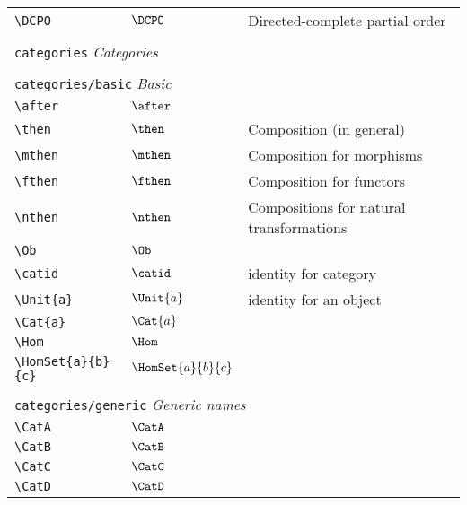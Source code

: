 \begin{longtable}{lll}
 {\color[rgb]{0.5,0.5,0.5}\texttt{\textbackslash DCPO}} & $\DCPO$ &  Directed-complete partial order\\ 
  &  & \\ 
 \multicolumn{3}{l}{{\color[rgb]{0.5,0.5,0.5}\texttt{categories}} \emph{Categories}}\\ 
 \hline
\hline
 &  & \\ 
 \multicolumn{3}{l}{{\color[rgb]{0.5,0.5,0.5}\texttt{categories/basic}} \emph{Basic}}\\ 
 \hline
{\color[rgb]{0.5,0.5,0.5}\texttt{\textbackslash after}} & $\after$ & \\ 
 {\color[rgb]{0.5,0.5,0.5}\texttt{\textbackslash then}} & $\then$ &  Composition (in general)\\ 
 {\color[rgb]{0.5,0.5,0.5}\texttt{\textbackslash mthen}} & $\mthen$ &  Composition for morphisms\\ 
 {\color[rgb]{0.5,0.5,0.5}\texttt{\textbackslash fthen}} & $\fthen$ &  Composition for functors\\ 
 {\color[rgb]{0.5,0.5,0.5}\texttt{\textbackslash nthen}} & $\nthen$ &  Compositions for natural transformations\\ 
 {\color[rgb]{0.5,0.5,0.5}\texttt{\textbackslash Ob}} & $\Ob$ & \\ 
 {\color[rgb]{0.5,0.5,0.5}\texttt{\textbackslash catid}} & $\catid$ &  identity for category\\ 
 {\color[rgb]{0.5,0.5,0.5}\texttt{\textbackslash Unit\{a\}}} & $\Unit{a}$ &  identity for an object\\ 
 {\color[rgb]{0.5,0.5,0.5}\texttt{\textbackslash Cat\{a\}}} & $\Cat{a}$ & \\ 
 {\color[rgb]{0.5,0.5,0.5}\texttt{\textbackslash Hom}} & $\Hom$ & \\ 
 {\color[rgb]{0.5,0.5,0.5}\texttt{\textbackslash HomSet\{a\}\{b\}\{c\}}} & $\HomSet{a}{b}{c}$ & \\ 
  &  & \\ 
 \multicolumn{3}{l}{{\color[rgb]{0.5,0.5,0.5}\texttt{categories/generic}} \emph{Generic names}}\\ 
 \hline
{\color[rgb]{0.5,0.5,0.5}\texttt{\textbackslash CatA}} & $\CatA$ & \\ 
 {\color[rgb]{0.5,0.5,0.5}\texttt{\textbackslash CatB}} & $\CatB$ & \\ 
 {\color[rgb]{0.5,0.5,0.5}\texttt{\textbackslash CatC}} & $\CatC$ & \\ 
 {\color[rgb]{0.5,0.5,0.5}\texttt{\textbackslash CatD}} & $\CatD$ & \\ 

\end{longtable}
